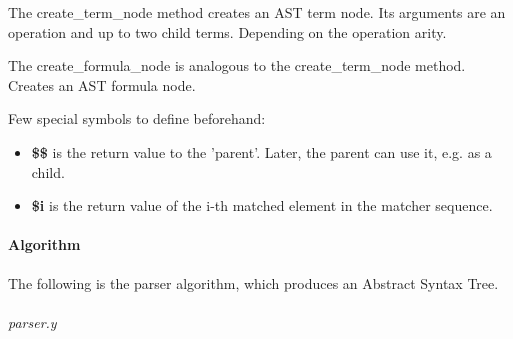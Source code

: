 \documentclass{article}
\begin{document}
			The create\_term\_node method creates an AST term node. Its arguments are an operation and up to two child terms. Depending on the operation arity.

			The create\_formula\_node is analogous to the create\_term\_node method. Creates an AST formula node.

			Few special symbols to define beforehand:
			\begin{itemize}
				\item \textbf{\$\$} is the return value to the 'parent'. Later, the parent can use it, e.g. as a child.
				\item \textbf{\$i} is the return value of the i-th matched element in the matcher sequence.
			\end{itemize}

		\paragraph{Algorithm} The following is the parser algorithm, which produces an Abstract Syntax Tree.
	\\
	\\
\noindent
\textit{parser.y}
\end{document}

